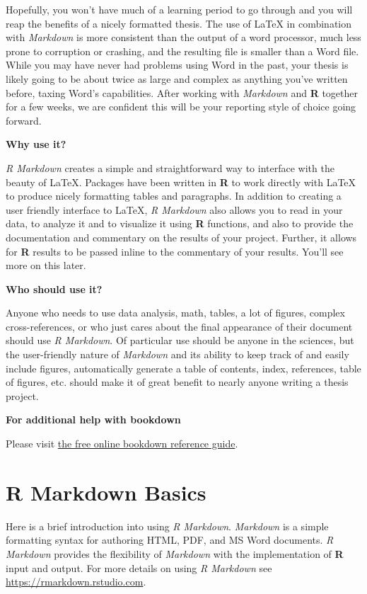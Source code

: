 \documentclass[
11pt, %
oneside, %
english, %
singlespacing, %
]{macthesis} %
\begin{document}
Hopefully, you won't have much of a learning period to go through and you will reap the benefits of a nicely formatted thesis. The use of LaTeX in combination with \emph{Markdown} is more consistent than the output of a word processor, much less prone to corruption or crashing, and the resulting file is smaller than a Word file. While you may have never had problems using Word in the past, your thesis is likely going to be about twice as large and complex as anything you've written before, taxing Word's capabilities. After working with \emph{Markdown} and \textbf{R} together for a few weeks, we are confident this will be your reporting style of choice going forward.

\textbf{Why use it?}

\emph{R Markdown} creates a simple and straightforward way to interface with the beauty of LaTeX. Packages have been written in \textbf{R} to work directly with LaTeX to produce nicely formatting tables and paragraphs. In addition to creating a user friendly interface to LaTeX, \emph{R Markdown} also allows you to read in your data, to analyze it and to visualize it using \textbf{R} functions, and also to provide the documentation and commentary on the results of your project. Further, it allows for \textbf{R} results to be passed inline to the commentary of your results. You'll see more on this later.

\textbf{Who should use it?}

Anyone who needs to use data analysis, math, tables, a lot of figures, complex cross-references, or who just cares about the final appearance of their document should use \emph{R Markdown}. Of particular use should be anyone in the sciences, but the user-friendly nature of \emph{Markdown} and its ability to keep track of and easily include figures, automatically generate a table of contents, index, references, table of figures, etc. should make it of great benefit to nearly anyone writing a thesis project.

\textbf{For additional help with bookdown}

Please visit \href{https://bookdown.org/yihui/bookdown/}{the free online bookdown reference guide}.

\chapter{R Markdown Basics}\label{rmd-basics}

Here is a brief introduction into using \emph{R Markdown}. \emph{Markdown} is a simple formatting syntax for authoring HTML, PDF, and MS Word documents. \emph{R Markdown} provides the flexibility of \emph{Markdown} with the implementation of \textbf{R} input and output. For more details on using \emph{R Markdown} see \url{https://rmarkdown.rstudio.com}.
\end{document}
